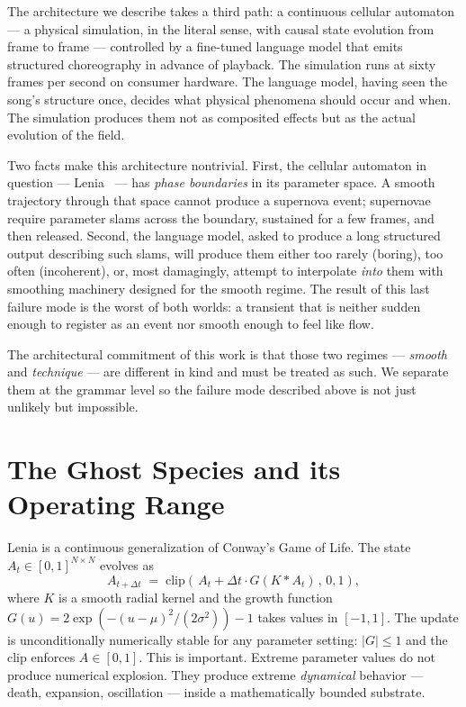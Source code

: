 \documentclass[11pt]{article}
\begin{document}
The architecture we describe takes a third path: a continuous cellular
automaton --- a physical simulation, in the literal sense, with causal
state evolution from frame to frame --- controlled by a fine-tuned language
model that emits structured choreography in advance of playback. The
simulation runs at sixty frames per second on consumer hardware. The
language model, having seen the song's structure once, decides what physical
phenomena should occur and when. The simulation produces them not as
composited effects but as the actual evolution of the field.

Two facts make this architecture nontrivial. First, the cellular automaton
in question --- Lenia~\cite{chan2019lenia} --- has \emph{phase boundaries}
in its parameter space. A smooth trajectory through that space cannot
produce a supernova event; supernovae require parameter slams across the
boundary, sustained for a few frames, and then released. Second, the
language model, asked to produce a long structured output describing such
slams, will produce them either too rarely (boring), too often (incoherent),
or, most damagingly, attempt to interpolate \emph{into} them with smoothing
machinery designed for the smooth regime. The result of this last failure
mode is the worst of both worlds: a transient that is neither sudden enough
to register as an event nor smooth enough to feel like flow.

The architectural commitment of this work is that those two regimes ---
\emph{smooth} and \emph{technique} --- are different in kind and must be
treated as such. We separate them at the grammar level so the failure mode
described above is not just unlikely but impossible.

\section{The Ghost Species and its Operating Range}

Lenia is a continuous generalization of Conway's Game of Life. The state
$A_t \in [0,1]^{N\times N}$ evolves as
\begin{equation}
  A_{t+\Delta t} \;=\; \mathrm{clip}\!\left(\,A_t + \Delta t \cdot G(K \!*\! A_t)\,, \, 0, 1\right),
\end{equation}
where $K$ is a smooth radial kernel and the growth function
$G(u) = 2\exp(-(u-\mu)^2/(2\sigma^2)) - 1$ takes values in $[-1, 1]$. The
update is unconditionally numerically stable for any parameter setting:
$|G| \le 1$ and the clip enforces $A \in [0,1]$. This is important. Extreme
parameter values do not produce numerical explosion. They produce extreme
\emph{dynamical} behavior --- death, expansion, oscillation --- inside a
mathematically bounded substrate.
\end{document}
